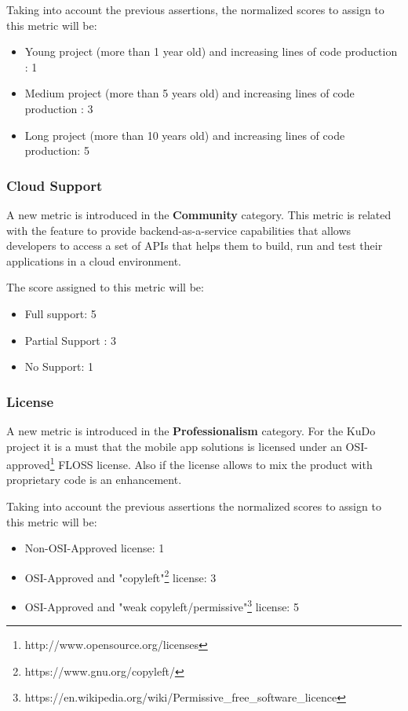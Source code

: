 \documentclass[a4paper,12pt]{book}
\begin{document}
Taking into account the previous assertions, the normalized scores to assign to this metric will be:
\begin{itemize}
 \item Young project (more than 1 year old) and increasing lines of code production : 1
  \item Medium project (more than 5 years old) and increasing lines of code production : 3
 \item Long project (more than 10 years old) and increasing lines of code production: 5
\end{itemize}

\subsubsection{Cloud Support}
\label{Cloud Support}
A new metric is introduced in the \textbf{Community} category. This metric is related with the feature to provide backend-as-a-service capabilities that allows developers to access a set of APIs that helps them to build, run and test their applications in a cloud environment.

The score assigned to this metric will be:
\begin{itemize}
 \item Full support: 5
  \item Partial Support : 3
 \item No Support: 1
\end{itemize}

\subsubsection{License}
\label{License}

A new metric is introduced in the \textbf{Professionalism} category. For the KuDo project it is a must that the mobile app solutions is licensed under an OSI-approved\footnote{http://www.opensource.org/licenses} FLOSS license. Also if the license allows to mix the product with proprietary code is an enhancement.

Taking into account the previous assertions the normalized scores to assign to this metric will be:
\begin{itemize}
 \item Non-OSI-Approved license: 1
 \item OSI-Approved and "copyleft"\footnote{https://www.gnu.org/copyleft/} license: 3
 \item OSI-Approved and "weak copyleft/permissive"\footnote{https://en.wikipedia.org/wiki/Permissive\_free\_software\_licence}  license: 5
\end{itemize}
\end{document}
